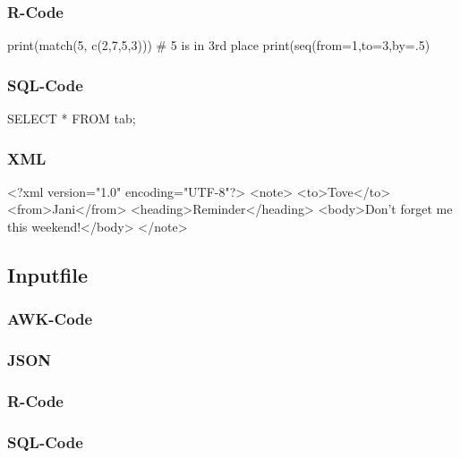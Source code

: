 \subsubsection{R-Code}
\begin{rcode}
  print(match(5, c(2,7,5,3))) #  5 is in 3rd place
  print(seq(from=1,to=3,by=.5) %
\end{rcode}

\subsubsection{SQL-Code}
\begin{sqlcode}
  SELECT *
  FROM tab;
\end{sqlcode}

\subsubsection{XML}
\begin{xmlcode}
  <?xml version="1.0" encoding="UTF-8"?>
  <note>
    <to>Tove</to>
    <from>Jani</from>
    <heading>Reminder</heading>
    <body>Don't forget me this weekend!</body>
  </note>
\end{xmlcode}

\subsection{Inputfile}

\subsubsection{AWK-Code}

\subsubsection{JSON}

\subsubsection{R-Code}

\subsubsection{SQL-Code}

